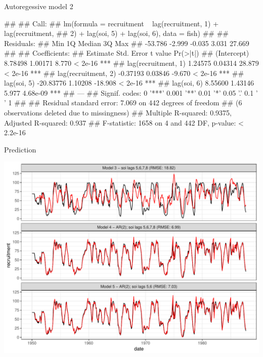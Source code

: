 \documentclass[11pt,ignorenonframetext,]{beamer}
\let\oldverbatim\verbatim
\let\endoldverbatim\endverbatim
\renewenvironment{verbatim}{\footnotesize\begin{spacing}{0.9}\oldverbatim}{\endoldverbatim\end{spacing}}
\begin{document}
\begin{frame}[fragile]{Autoregessive model 2}

\begin{verbatim}
## 
## Call:
## lm(formula = recruitment ~ lag(recruitment, 1) + lag(recruitment, 
##     2) + lag(soi, 5) + lag(soi, 6), data = fish)
## 
## Residuals:
##     Min      1Q  Median      3Q     Max 
## -53.786  -2.999  -0.035   3.031  27.669 
## 
## Coefficients:
##                      Estimate Std. Error t value Pr(>|t|)    
## (Intercept)           8.78498    1.00171   8.770  < 2e-16 ***
## lag(recruitment, 1)   1.24575    0.04314  28.879  < 2e-16 ***
## lag(recruitment, 2)  -0.37193    0.03846  -9.670  < 2e-16 ***
## lag(soi, 5)         -20.83776    1.10208 -18.908  < 2e-16 ***
## lag(soi, 6)           8.55600    1.43146   5.977 4.68e-09 ***
## ---
## Signif. codes:  0 '***' 0.001 '**' 0.01 '*' 0.05 '.' 0.1 ' ' 1
## 
## Residual standard error: 7.069 on 442 degrees of freedom
##   (6 observations deleted due to missingness)
## Multiple R-squared:  0.9375, Adjusted R-squared:  0.937 
## F-statistic:  1658 on 4 and 442 DF,  p-value: < 2.2e-16
\end{verbatim}

\end{frame}

\begin{frame}{Prediction}

\begin{center}\includegraphics{Lec7_files/figure-beamer/unnamed-chunk-12-1} \end{center}

\end{frame}
\end{document}
